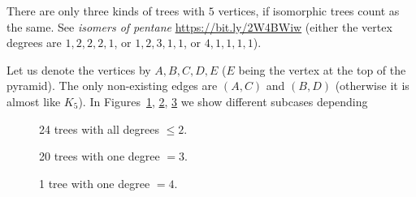 \documentclass[jou]{apa6}
\begin{document}
There are only three kinds of trees with $5$ vertices, if isomorphic trees count as the same. 
See {\em isomers of pentane} \textendash{} \url{https://bit.ly/2W4BWiw} (either the vertex degrees are 
$1,2,2,2,1$, or $1,2,3,1,1$, or $4,1,1,1,1$).

Let us denote the vertices by $A,B,C,D,E$ ($E$ being the vertex at the top of the pyramid). 
The only non-existing edges are $(A,C)$ and $(B,D)$ (otherwise it is almost like $K_5$). 
In Figures~\ref{fig:spanning-trees-on-w5-a}, \ref{fig:spanning-trees-on-w5-b}, 
\ref{fig:spanning-trees-on-w5-c} we show different subcases depending 

\begin{figure}[!htb]
\caption{\label{fig:spanning-trees-on-w5-a} 24 trees with all degrees $\leq 2$.}
\end{figure}

\begin{figure}[!htb]
\caption{\label{fig:spanning-trees-on-w5-b} 20 trees with one degree $=3$.}
\end{figure}

\begin{figure}[!htb]
\caption{\label{fig:spanning-trees-on-w5-c} 1 tree with one degree $=4$.}
\end{figure}
\end{document}
